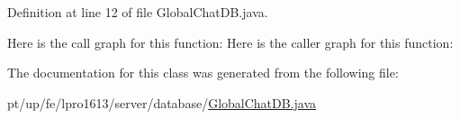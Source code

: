 Definition at line 12 of file Global\+Chat\+D\+B.\+java.

Here is the call graph for this function\+:
Here is the caller graph for this function\+:


The documentation for this class was generated from the following file\+:\begin{DoxyCompactItemize}
\item 
pt/up/fe/lpro1613/server/database/\hyperlink{_global_chat_d_b_8java}{Global\+Chat\+D\+B.\+java}\end{DoxyCompactItemize}
